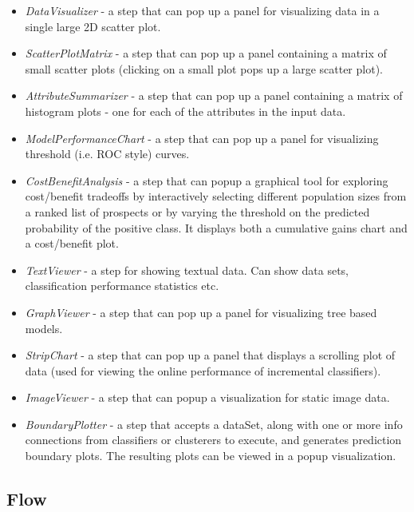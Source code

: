 \begin{itemize}
	\item \textit{DataVisualizer} - a step that can pop up a panel for 
	visualizing data in a single large 2D scatter plot.
	\item \textit{ScatterPlotMatrix} - a step that can pop up a panel 
	containing a matrix of small scatter plots (clicking on a small plot 
	pops up a large scatter plot).
	\item \textit{AttributeSummarizer} - a step that can pop up a panel 
	containing a matrix of histogram plots - one for each of the attributes 
	in the input data.
	\item \textit{ModelPerformanceChart} - a step that can pop up a 
	panel for visualizing threshold (i.e. ROC style) curves.
        \item \textit{CostBenefitAnalysis} - a step that can popup a graphical
          tool for exploring cost/benefit tradeoffs by interactively selecting
          different population sizes from a ranked list of prospects or by 
          varying the threshold on the predicted probability of the positive class. It
          displays both a cumulative gains chart and a cost/benefit plot.
	\item \textit{TextViewer} - a step for showing textual data. Can show 
	data sets, classification performance statistics etc.
	\item \textit{GraphViewer} - a step that can pop up a panel for 
	visualizing tree based models.
	\item \textit{StripChart} - a step that can pop up a panel that displays 
	a scrolling plot of data (used for viewing the online performance of 
	incremental classifiers).
        \item \textit{ImageViewer} - a step that can popup a visualization for static
          image data.
        \item \textit{BoundaryPlotter} - a step that accepts a dataSet, along with one
          or more info connections from classifiers or clusterers to execute, and generates
          prediction boundary plots. The resulting plots can be viewed in a popup visualization.
\end{itemize}

\subsection{Flow}

